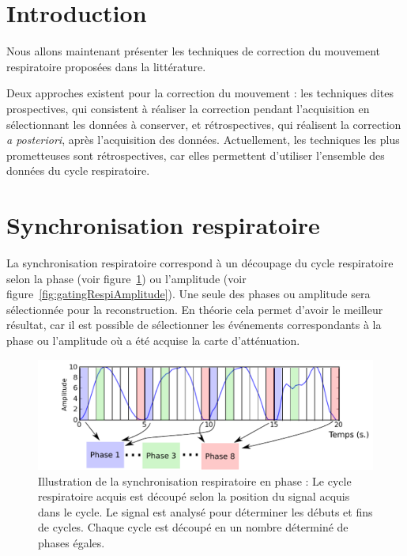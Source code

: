 \label{lab:corrMvt}

\section{Introduction}

Nous allons maintenant présenter les techniques de correction du mouvement respiratoire proposées dans la littérature. 

Deux approches existent pour la correction du mouvement : les techniques dites prospectives, qui consistent à réaliser la correction pendant l'acquisition en sélectionnant les données à conserver, et rétrospectives, qui réalisent la correction \textit{a posteriori}, après l'acquisition des données. Actuellement, les techniques les plus prometteuses sont rétrospectives, car elles permettent d'utiliser l'ensemble des données du cycle respiratoire.

\section{Synchronisation respiratoire}

La synchronisation respiratoire correspond à un découpage du cycle respiratoire selon la phase (voir figure~\ref{fig:gatingRespi}) ou l'amplitude (voir figure~\ref{fig:gatingRespiAmplitude}). Une seule des phases ou amplitude sera sélectionnée pour la reconstruction. En théorie cela permet d'avoir le meilleur résultat, car il est possible de sélectionner les événements correspondants à la phase ou l'amplitude où a été acquise la carte d'atténuation.


\begin{figure}[h!]
	\begin{center}
		\includegraphics[width=14cm]{images/ET-IM}
	\end{center}
	\caption[Illustration de la synchronisation respiratoire en phase]{Illustration de la synchronisation respiratoire en phase : Le cycle respiratoire acquis est découpé selon la position du signal acquis dans le cycle. Le signal est analysé pour déterminer les débuts et fins de cycles. Chaque cycle est découpé en un nombre déterminé de phases égales.} 
	\label{fig:gatingRespi}
\end{figure}


